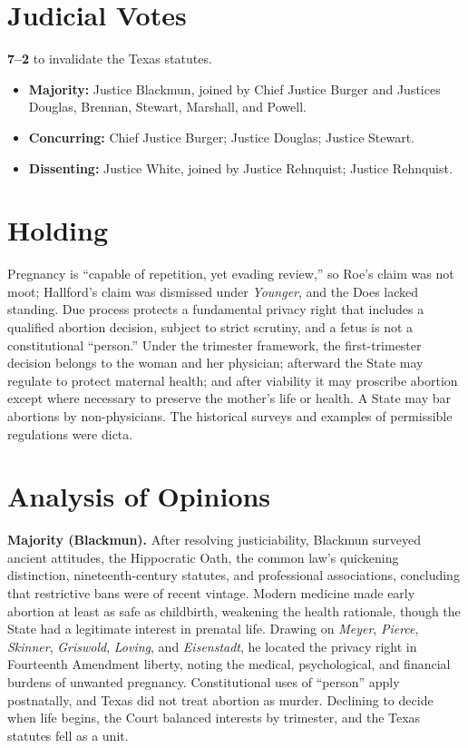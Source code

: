 \documentclass[12pt]{article}
\begin{document}
\section{Judicial Votes}

\textbf{7--2} to invalidate the Texas statutes.
\begin{itemize}
\item \textbf{Majority:} Justice Blackmun, joined by Chief Justice Burger and Justices Douglas, Brennan, Stewart, Marshall, and Powell.
\item \textbf{Concurring:} Chief Justice Burger; Justice Douglas; Justice Stewart.
\item \textbf{Dissenting:} Justice White, joined by Justice Rehnquist; Justice Rehnquist.
\end{itemize}

\section{Holding}

Pregnancy is ``capable of repetition, yet evading review,'' so Roe's claim was not moot; Hallford's claim was dismissed under \textit{Younger}, and the Does lacked standing. Due process protects a fundamental privacy right that includes a qualified abortion decision, subject to strict scrutiny, and a fetus is not a constitutional ``person.'' Under the trimester framework, the first-trimester decision belongs to the woman and her physician; afterward the State may regulate to protect maternal health; and after viability it may proscribe abortion except where necessary to preserve the mother's life or health. A State may bar abortions by non-physicians. The historical surveys and examples of permissible regulations were dicta.

\section{Analysis of Opinions}

\textbf{Majority (Blackmun).} After resolving justiciability, Blackmun surveyed ancient attitudes, the Hippocratic Oath, the common law's quickening distinction, nineteenth-century statutes, and professional associations, concluding that restrictive bans were of recent vintage. Modern medicine made early abortion at least as safe as childbirth, weakening the health rationale, though the State had a legitimate interest in prenatal life. Drawing on \textit{Meyer}, \textit{Pierce}, \textit{Skinner}, \textit{Griswold}, \textit{Loving}, and \textit{Eisenstadt}, he located the privacy right in Fourteenth Amendment liberty, noting the medical, psychological, and financial burdens of unwanted pregnancy. Constitutional uses of ``person'' apply postnatally, and Texas did not treat abortion as murder. Declining to decide when life begins, the Court balanced interests by trimester, and the Texas statutes fell as a unit.
\end{document}
